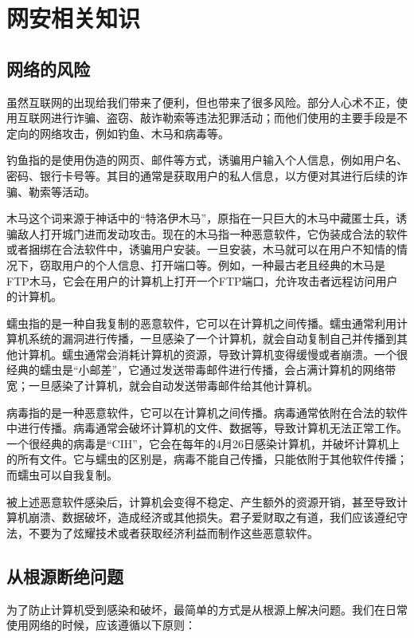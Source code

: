 \documentclass[../main.tex]{subfiles}
\begin{document}
\section{网安相关知识} %

\subsection{网络的风险}

虽然互联网的出现给我们带来了便利，但也带来了很多风险。部分人心术不正，使用互联网进行诈骗、盗窃、敲诈勒索等违法犯罪活动；而他们使用的主要手段是不定向的网络攻击，例如钓鱼、木马和病毒等。

钓鱼指的是使用伪造的网页、邮件等方式，诱骗用户输入个人信息，例如用户名、密码、银行卡号等。其目的通常是获取用户的私人信息，以方便对其进行后续的诈骗、勒索等活动。

木马这个词来源于神话中的“特洛伊木马”，原指在一只巨大的木马中藏匿士兵，诱骗敌人打开城门进而发动攻击。现在的木马指一种恶意软件，它伪装成合法的软件或者捆绑在合法软件中，诱骗用户安装。一旦安装，木马就可以在用户不知情的情况下，窃取用户的个人信息、打开端口等。例如，一种最古老且经典的木马是FTP木马，它会在用户的计算机上打开一个FTP端口，允许攻击者远程访问用户的计算机。

蠕虫指的是一种自我复制的恶意软件，它可以在计算机之间传播。蠕虫通常利用计算机系统的漏洞进行传播，一旦感染了一个计算机，就会自动复制自己并传播到其他计算机。蠕虫通常会消耗计算机的资源，导致计算机变得缓慢或者崩溃。一个很经典的蠕虫是“小邮差”，它通过发送带毒邮件进行传播，会占满计算机的网络带宽；一旦感染了计算机，就会自动发送带毒邮件给其他计算机。

病毒指的是一种恶意软件，它可以在计算机之间传播。病毒通常依附在合法的软件中进行传播。病毒通常会破坏计算机的文件、数据等，导致计算机无法正常工作。一个很经典的病毒是“CIH”，它会在每年的4月26日感染计算机，并破坏计算机上的所有文件。它与蠕虫的区别是，病毒不能自己传播，只能依附于其他软件传播；而蠕虫可以自我复制。

被上述恶意软件感染后，计算机会变得不稳定、产生额外的资源开销，甚至导致计算机崩溃、数据破坏，造成经济或其他损失。君子爱财取之有道，我们应该遵纪守法，不要为了炫耀技术或者获取经济利益而制作这些恶意软件。

\subsection{从根源断绝问题}

为了防止计算机受到感染和破坏，最简单的方式是从根源上解决问题。我们在日常使用网络的时候，应该遵循以下原则：
\end{document}
